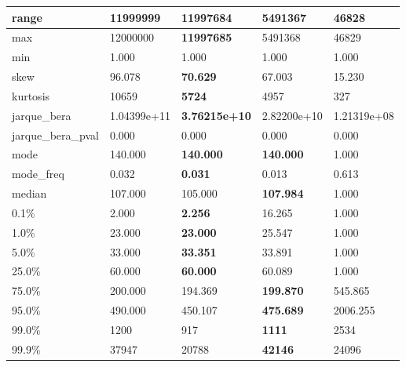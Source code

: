 \begin{table}[H]
\begin{tabular}{|l|m{10em}|m{10em}|m{10em}|m{10em}|}
\hline range & 11999999 & \bfseries 11997684 & 5491367 & \cellcolor[rgb]{0.9, 0.54, 0.52} 46828 \\
\hline max & 12000000 & \bfseries 11997685 & 5491368 & \cellcolor[rgb]{0.9, 0.54, 0.52} 46829 \\
\hline min & 1.000 & 1.000 & 1.000 & 1.000 \\
\hline skew & 96.078 & \bfseries 70.629 & 67.003 & \cellcolor[rgb]{0.9, 0.54, 0.52} 15.230 \\
\hline kurtosis & 10659 & \bfseries 5724 & 4957 & \cellcolor[rgb]{0.9, 0.54, 0.52} 327 \\
\hline jarque\_bera & 1.04399e+11 & \bfseries 3.76215e+10 & 2.82200e+10 & \cellcolor[rgb]{0.9, 0.54, 0.52} 1.21319e+08 \\
\hline jarque\_bera\_pval & 0.000 & 0.000 & 0.000 & 0.000 \\
\hline mode & 140.000 & \bfseries 140.000 & \bfseries 140.000 & \cellcolor[rgb]{0.9, 0.54, 0.52} 1.000 \\
\hline mode\_freq & 0.032 & \bfseries 0.031 & 0.013 & \cellcolor[rgb]{0.9, 0.54, 0.52} 0.613 \\
\hline median & 107.000 & 105.000 & \bfseries 107.984 & \cellcolor[rgb]{0.9, 0.54, 0.52} 1.000 \\
\hline 0.1\% & 2.000 & \bfseries 2.256 & \cellcolor[rgb]{0.9, 0.54, 0.52} 16.265 & 1.000 \\
\hline 1.0\% & 23.000 & \bfseries 23.000 & 25.547 & \cellcolor[rgb]{0.9, 0.54, 0.52} 1.000 \\
\hline 5.0\% & 33.000 & \bfseries 33.351 & 33.891 & \cellcolor[rgb]{0.9, 0.54, 0.52} 1.000 \\
\hline 25.0\% & 60.000 & \bfseries 60.000 & 60.089 & \cellcolor[rgb]{0.9, 0.54, 0.52} 1.000 \\
\hline 75.0\% & 200.000 & 194.369 & \bfseries 199.870 & \cellcolor[rgb]{0.9, 0.54, 0.52} 545.865 \\
\hline 95.0\% & 490.000 & 450.107 & \bfseries 475.689 & \cellcolor[rgb]{0.9, 0.54, 0.52} 2006.255 \\
\hline 99.0\% & 1200 & 917 & \bfseries 1111 & \cellcolor[rgb]{0.9, 0.54, 0.52} 2534 \\
\hline 99.9\% & 37947 & \cellcolor[rgb]{0.9, 0.54, 0.52} 20788 & \bfseries 42146 & 24096 \\
\hline
\end{tabular}
\end{table}
